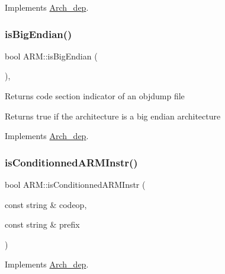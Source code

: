 Implements \hyperlink{classArch__dep_a71398abb52e277ead74615af892a2dd8}{Arch\+\_\+dep}.

\mbox{\label{classARM_ae86effb7574c3627cd114ec35e5bd096}} 
\subsubsection{\texorpdfstring{is\+Big\+Endian()}{isBigEndian()}}
{\footnotesize\ttfamily bool A\+R\+M\+::is\+Big\+Endian (\begin{DoxyParamCaption}{ }\end{DoxyParamCaption})\hspace{0.3cm}{\ttfamily [inline]}, {\ttfamily [virtual]}}

Returns code section indicator of an objdump file

Returns true if the architecture is a big endian architecture 

Implements \hyperlink{classArch__dep_a2734ff9ad6b2d894a2573eaedcd46989}{Arch\+\_\+dep}.

\mbox{\label{classARM_a9ef2e856b711bdb39806ebb3d59c4ee3}} 
\subsubsection{\texorpdfstring{is\+Conditionned\+A\+R\+M\+Instr()}{isConditionnedARMInstr()}}
{\footnotesize\ttfamily bool A\+R\+M\+::is\+Conditionned\+A\+R\+M\+Instr (\begin{DoxyParamCaption}\item[{const string \&}]{codeop,  }\item[{const string \&}]{prefix }\end{DoxyParamCaption})\hspace{0.3cm}{\ttfamily [virtual]}}



Implements \hyperlink{classArch__dep_a41eb152029e2792b59337bc4b370ec9f}{Arch\+\_\+dep}.

\mbox{\label{classARM_a97cd03133ef631d78cc567c8ded65433}} 
